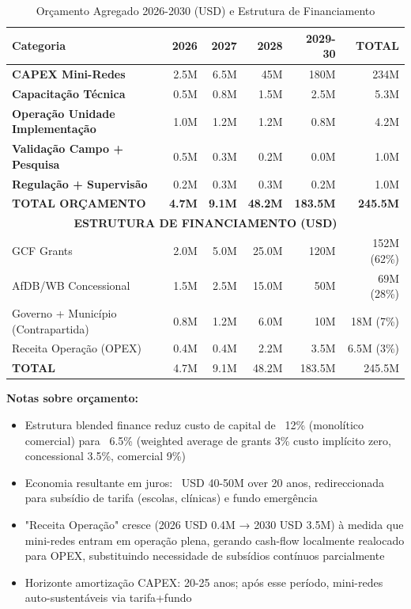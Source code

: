 \documentclass[12pt, a4paper]{article}
\begin{document}
\begin{table}[H]
\centering
\caption{Orçamento Agregado 2026-2030 (USD) e Estrutura de Financiamento}
\label{tab:budget}
\small
\begin{tabular}{|l|r|r|r|r|r|}
\hline
\textbf{Categoria} & \textbf{2026} & \textbf{2027} & \textbf{2028} & \textbf{2029-30} & \textbf{TOTAL} \\
\hline
\textbf{CAPEX Mini-Redes} & 2.5M & 6.5M & 45M & 180M & 234M \\
\textbf{Capacitação Técnica} & 0.5M & 0.8M & 1.5M & 2.5M & 5.3M \\
\textbf{Operação Unidade Implementação} & 1.0M & 1.2M & 1.2M & 0.8M & 4.2M \\
\textbf{Validação Campo + Pesquisa} & 0.5M & 0.3M & 0.2M & 0.0M & 1.0M \\
\textbf{Regulação + Supervisão} & 0.2M & 0.3M & 0.3M & 0.2M & 1.0M \\
\hline
\textbf{TOTAL ORÇAMENTO} & \textbf{4.7M} & \textbf{9.1M} & \textbf{48.2M} & \textbf{183.5M} & \textbf{245.5M} \\
\hline
\multicolumn{6}{|c|}{\textbf{ESTRUTURA DE FINANCIAMENTO (USD)}} \\
\hline
GCF Grants & 2.0M & 5.0M & 25.0M & 120M & 152M (62\%) \\
AfDB/WB Concessional & 1.5M & 2.5M & 15.0M & 50M & 69M (28\%) \\
Governo + Município (Contrapartida) & 0.8M & 1.2M & 6.0M & 10M & 18M (7\%) \\
Receita Operação (OPEX) & 0.4M & 0.4M & 2.2M & 3.5M & 6.5M (3\%) \\
\hline
\textbf{TOTAL} & 4.7M & 9.1M & 48.2M & 183.5M & 245.5M \\
\hline
\end{tabular}
\end{table}

\textbf{Notas sobre orçamento:}
\begin{itemize}
\item Estrutura blended finance reduz custo de capital de ~12\% (monolítico comercial) para ~6.5\% (weighted average de grants 3\% custo implícito zero, concessional 3.5\%, comercial 9\%)
\item Economia resultante em juros: ~USD 40-50M over 20 anos, redireccionada para subsídio de tarifa (escolas, clínicas) e fundo emergência
\item "Receita Operação" cresce (2026 USD 0.4M → 2030 USD 3.5M) à medida que mini-redes entram em operação plena, gerando cash-flow localmente realocado para OPEX, substituindo necessidade de subsídios contínuos parcialmente
\item Horizonte amortização CAPEX: 20-25 anos;
 após esse período, mini-redes auto-sustentáveis via tarifa+fundo
\end{itemize}
\end{document}
